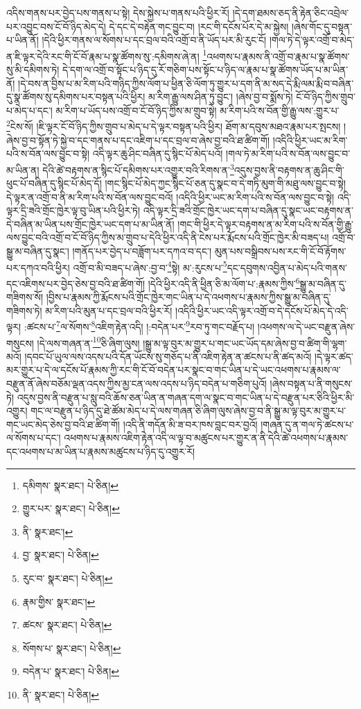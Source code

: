 འདིས་གནས་པར་བྱེད་པས་གནས་པ་སྟེ། དེས་སྐྱེས་པ་གནས་པའི་ཕྱིར་རོ། །དེ་དག་ཐམས་ཅད་ནི་རྟེན་ཅིང་འབྲེལ་པར་འབྱུང་བས་ངོ་བོ་ཉིད་མེད་དེ། དེ་དང་དེ་བརྟེན་གང་བྱུང་བ། །རང་གི་དངོས་པོར་དེ་མ་སྐྱེས། །ཞེས་གོང་དུ་བསྟན་པ་ཡིན་ནོ། །དེའི་ཕྱིར་གནས་ལ་སོགས་པ་དང་བྲལ་བའི་འགྲོ་བ་ནི་ཡོད་པར་མི་རུང་ངོ། །གལ་ཏེ་དེ་ལྟར་འགྲོ་བ་མེད་ན་ཇི་ལྟར་དེའི་རང་གི་ངོ་བོ་རྣམ་པ་སྣ་ཚོགས་སུ་:དམིགས་ཞེ་ན། \footnote{དམིགས་  སྣར་ཐང་།  པེ་ཅིན། }འཕགས་པ་རྣམས་ནི་འགྲོ་བ་རྣམ་པ་སྣ་ཚོགས་སུ་མི་དམིགས་ཏེ། དེ་དག་ལ་འགྲོ་བ་སྟོང་པ་ཉིད་དུ་རོ་གཅིག་པས་སྟོང་པ་ཉིད་ལ་རྣམ་པ་སྣ་ཚོགས་ཡོད་པ་མ་ཡིན་ནོ། །དེ་བས་ན་བྱིས་པ་མ་རིག་པའི་གཉིད་ཀྱིས་ལོག་པ་ཕྱིན་ཅི་ལོག་ཏུ་གྱུར་པ་དག་ནི་མ་སད་དེ་རྨི་ལམ་རྨི་བ་བཞིན་དུ་སྣ་ཚོགས་སུ་དམིགས་པར་བསྟན་པའི་ཕྱིར། མ་རིག་རྒྱུ་ལས་ཤིན་ཏུ་བྱུང་། །ཞེས་བྱ་བ་སྨོས་ཏེ། ངོ་བོ་ཉིད་ཀྱིས་གྲུབ་པ་མེད་པ་དང་། མ་རིག་པ་ཡོད་པས་འགྲོ་བ་ངོ་བོ་ཉིད་ཀྱིས་མ་གྲུབ་སྟེ། མ་རིག་པའི་ས་བོན་གྱི་རྒྱུ་ལས་:གྱུར་པ་\footnote{གྱུར་པར་  སྣར་ཐང་།  པེ་ཅིན། }ངེས་སོ། །ཇི་ལྟར་ངོ་བོ་ཉིད་ཀྱིས་གྲུབ་པ་མེད་པ་དེ་ལྟར་བསྟན་པའི་ཕྱིར། ཐོག་མ་དབུས་མཐའ་རྣམ་པར་སྤངས། །ཞེས་བྱ་བ་སྟོན་ཏེ་སྐྱེ་བ་དང་གནས་པ་དང་འཇིག་པ་དང་བྲལ་བ་ཞེས་བྱ་བའི་ཐ་ཚིག་གོ། །འདིའི་ཕྱིར་ཡང་མ་རིག་པའི་ས་བོན་ལས་བྱུང་བ་སྟེ། འདི་ལྟར་ཆུ་ཤིང་བཞིན་དུ་སྙིང་པོ་མེད་པའོ། །གལ་ཏེ་མ་རིག་པའི་ས་བོན་ལས་བྱུང་བ་མ་ཡིན་ན། དེའི་ཚེ་བརྟགས་ན་སྙིང་པོ་དམིགས་པར་འགྱུར་བའི་རིགས་ན་\footnote{ནི་  སྣར་ཐང་། }འདུས་བྱས་ནི་བརྟགས་ན་ཆུ་ཤིང་གི་ཕུང་པོ་བཞིན་དུ་སྙིང་པོ་མེད་དོ། །གང་སྙིང་པོ་མེད་ཀྱང་སྙིང་པོ་ཅན་དུ་སྣང་བ་དེ་གཏི་མུག་གི་མཐུ་ལས་བྱུང་བ་སྟེ། དེ་ལྟར་ན་འགྲོ་བ་ནི་མ་རིག་པའི་ས་བོན་ལས་བྱུང་བའོ། །འདིའི་ཕྱིར་ཡང་མ་རིག་པའི་ས་བོན་ལས་བྱུང་བ་སྟེ། འདི་ལྟར་དྲི་ཟའི་གྲོང་ཁྱེར་ལྟ་བུ་ཡིན་པའི་ཕྱིར་ཏེ། འདི་ལྟར་དྲི་ཟའི་གྲོང་ཁྱེར་ཡང་དག་པ་བཞིན་དུ་སྣང་ཡང་བརྟགས་ན་དེ་བཞིན་མ་ཡིན་པས་གྲོང་ཁྱེར་ཡང་དག་པ་མ་ཡིན་ནོ། །གང་གི་ཕྱིར་དེ་ལྟར་བརྟགས་ན་མ་རིག་པའི་ས་བོན་གྱི་རྒྱུ་ལས་བྱུང་བའི་འགྲོ་བ་ངོ་བོ་ཉིད་ཀྱིས་མ་གྲུབ་པ་དེའི་ཕྱིར་འདི་ནི་ངེས་པར་རྨོངས་པའི་གྲོང་ཁྱེར་མི་བཟད་པ། འགྲོ་བ་སྒྱུ་མ་བཞིན་དུ་སྣང་། །གནོད་པར་བྱེད་པ་བཟློག་པར་དཀའ་བ་དང་། མུན་པས་བསྒྲིབས་པས་རང་གི་ངོ་བོ་རྟོགས་པར་དཀའ་བའི་ཕྱིར། འགྲོ་བ་མི་བཟད་པ་ཞེས་:བྱ་བ་\footnote{བྱ་  སྣར་ཐང་།  པེ་ཅིན། }སྟེ། མ་:རུངས་པ་\footnote{རུང་བ་  སྣར་ཐང་།  པེ་ཅིན། }དང་དབུགས་འབྱིན་པ་མེད་པའི་གནས་དང་འཇིགས་པར་བྱེད་ཅེས་བྱ་བའི་ཐ་ཚིག་གོ། །དེའི་ཕྱིར་འདི་ནི་ཕྱིན་ཅི་མ་ལོག་པ་:རྣམས་ཀྱིས་\footnote{རྣམ་གྱིས་  སྣར་ཐང་། }སྒྱུ་མ་བཞིན་དུ་གཟིགས་སོ། །བྱིས་པ་རྣམས་ཀྱི་རྨོངས་པའི་གྲོང་ཁྱེར་གང་ཡིན་པ་དེ་འཕགས་པ་རྣམས་ཀྱིས་སྒྱུ་མ་བཞིན་དུ་གཟིགས་ཏེ། མ་རིག་པའི་མུན་པ་དང་བྲལ་བའི་ཕྱིར་རོ། །འདིའི་ཕྱིར་ཡང་འདི་ལྟར་འགྲོ་བ་དེ་དངོས་པོ་མེད་དེ་འདི་ལྟར། :ཚངས་པ་\footnote{ཚངས་  སྣར་ཐང་།  པེ་ཅིན། }ལ་སོགས་\footnote{སོགས་པ་  སྣར་ཐང་།  པེ་ཅིན། }འཇིག་རྟེན་འདི། །:བདེན་པར་\footnote{བདེན་པ་  སྣར་ཐང་།  པེ་ཅིན། }རབ་ཏུ་གང་བརྗོད་པ། །འཕགས་ལ་དེ་ཡང་བརྫུན་ཞེས་གསུངས། །དེ་ལས་གཞན་ན་\footnote{ནི་  སྣར་ཐང་།  པེ་ཅིན། }ཅི་ཞིག་ལུས། །སྒྱུ་མ་ལྟ་བུར་མ་གྱུར་པ་གང་ཡང་ཡོད་དམ་ཞེས་བྱ་བ་ཚིག་གི་ལྷག་མའོ། །དབང་པོ་ཡུལ་ལས་འདས་པའི་དོན་ཡོངས་སུ་གཅོད་པ་ནི་འཇིག་རྟེན་ན་ཚངས་པ་ནི་ཚད་མའོ། །དེ་ལྟར་ཚད་མར་གྱུར་པ་དེ་ལ་དངོས་པོ་རྣམས་ཀྱི་རང་གི་ངོ་བོ་བདེན་པར་སྣང་བ་གང་ཡིན་པ་དེ་ཡང་འཕགས་པ་རྣམས་ལ་བརྫུན་ནོ་ཞེས་བཅོམ་ལྡན་འདས་ཀྱིས་མྱ་ངན་ལས་འདས་པ་ཉིད་བདེན་པ་གཅིག་པུའོ། །ཞེས་བསྟན་པ་ནི་གསུངས་ཏེ། འདུས་བྱས་ནི་བརྫུན་པ་སླུ་བའི་ཆོས་ཅན་ཡིན་ན་གཞན་དག་ལ་སྣང་བ་གང་ཡིན་པ་དེ་བརྫུན་པར་ཅིའི་ཕྱིར་མི་འགྱུར། གང་ལ་བརྫུན་པ་ཉིད་དུ་ཐེ་ཚོམ་མེད་པ་དེ་ལས་གཞན་ཅི་ཞིག་ལུས་ཞེས་བྱ་བ་ནི་སྒྱུ་མ་ལྟ་བུར་མ་གྱུར་པ་གང་ཡང་མེད་ཅེས་བྱ་བའི་ཐ་ཚིག་གོ། །འདི་ནི་གདོན་མི་ཟ་བར་ཁས་བླང་བར་བྱའོ། །གཞན་དུ་ན་གལ་ཏེ་ཚངས་པ་ལ་སོགས་པ་དང་། འཕགས་པ་རྣམས་འཇིག་རྟེན་འདི་ལ་ལྟ་བ་མཚུངས་པར་གྱུར་ན་ནི་དེའི་ཚེ་འཕགས་པ་རྣམས་དང་འཕགས་པ་མ་ཡིན་པ་རྣམས་མཚུངས་པ་ཉིད་དུ་འགྱུར་རོ། 